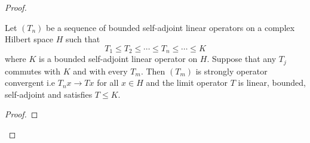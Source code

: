 \begin{proof}
\begin{theorem}\label{9.3-3}
   Let \( ({T}_{n}) \) be a sequence of bounded self-adjoint linear operators on a complex Hilbert space \( H \) such that  \[  {T}_{1} \leq {T}_{2} \leq \cdots \leq {T}_{n} \leq \cdots \leq K  \]
   where \( K   \) is a bounded self-adjoint linear operator on \( H  \). Suppose that any \( {T}_{j} \) commutes with \( K  \) and with every \( {T}_{m} \). Then \( ({T}_{m}) \) is strongly operator convergent i.e \( {T}_{n}x \to Tx \) for all \( x \in H \) and the limit operator \( T  \) is linear, bounded, self-adjoint and satisfies \( T \leq K  \).
\end{theorem}
\begin{proof}

\end{proof}



\end{proof}
